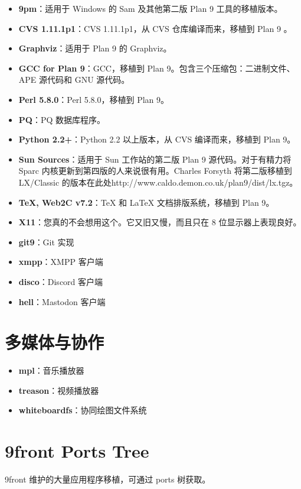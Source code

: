 \documentclass[12pt,UTF8]{ctexbook}
\begin{document}
\begin{itemize}
\item \textbf{9pm}：适用于 Windows 的 Sam 及其他第二版 Plan 9 工具的移植版本。
\item \textbf{CVS 1.11.1p1}：CVS 1.11.1p1，从 CVS 仓库编译而来，移植到 Plan 9 。
\item \textbf{Graphviz}：适用于 Plan 9 的 Graphviz。
\item \textbf{GCC for Plan 9}：GCC，移植到 Plan 9。包含三个压缩包：二进制文件、APE 源代码和 GNU 源代码。
\item \textbf{Perl 5.8.0}：Perl 5.8.0，移植到 Plan 9。
\item \textbf{PQ}：PQ 数据库程序。
\item \textbf{Python 2.2+}：Python 2.2 以上版本，从 CVS 编译而来，移植到 Plan 9。
\item \textbf{Sun Sources}：适用于 Sun 工作站的第二版 Plan 9 源代码。对于有精力将 Sparc 内核更新到第四版的人来说很有用。Charles Forsyth 将第二版移植到 LX/Classic 的版本在此处http://www.caldo.demon.co.uk/plan9/dist/lx.tgz。
\item \textbf{TeX, Web2C v7.2}：TeX 和 LaTeX 文档排版系统，移植到 Plan 9。
\item \textbf{X11}：您真的不会想用这个。它又旧又慢，而且只在 8 位显示器上表现良好。
\item \textbf{git9}：Git 实现
\item \textbf{xmpp}：XMPP 客户端
\item \textbf{disco}：Discord 客户端
\item \textbf{hell}：Mastodon 客户端
\end{itemize}

\section{多媒体与协作}

\begin{itemize}
\item \textbf{mpl}：音乐播放器
\item \textbf{treason}：视频播放器
\item \textbf{whiteboardfs}：协同绘图文件系统
\end{itemize}

\section{9front Ports Tree}

9front 维护的大量应用程序移植，可通过 ports 树获取。
\end{document}
